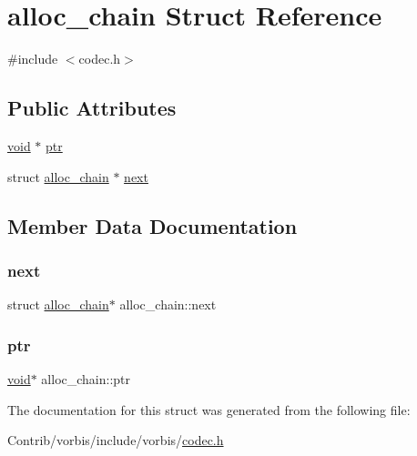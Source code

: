 \hypertarget{structalloc__chain}{}\section{alloc\+\_\+chain Struct Reference}
\label{structalloc__chain}


{\ttfamily \#include $<$codec.\+h$>$}

\subsection*{Public Attributes}
\begin{DoxyCompactItemize}
\item 
\mbox{\hyperlink{_s_d_l__opengles2__gl2ext_8h_ae5d8fa23ad07c48bb609509eae494c95}{void}} $\ast$ \mbox{\hyperlink{structalloc__chain_a564538413768f266bd5bda09d892e99d}{ptr}}
\item 
struct \mbox{\hyperlink{structalloc__chain}{alloc\+\_\+chain}} $\ast$ \mbox{\hyperlink{structalloc__chain_a596f6605e59080015c3c6dfd07326c83}{next}}
\end{DoxyCompactItemize}


\subsection{Member Data Documentation}
\mbox{\label{structalloc__chain_a596f6605e59080015c3c6dfd07326c83}} 
\subsubsection{\texorpdfstring{next}{next}}
{\footnotesize\ttfamily struct \mbox{\hyperlink{structalloc__chain}{alloc\+\_\+chain}}$\ast$ alloc\+\_\+chain\+::next}

\mbox{\label{structalloc__chain_a564538413768f266bd5bda09d892e99d}} 
\subsubsection{\texorpdfstring{ptr}{ptr}}
{\footnotesize\ttfamily \mbox{\hyperlink{_s_d_l__opengles2__gl2ext_8h_ae5d8fa23ad07c48bb609509eae494c95}{void}}$\ast$ alloc\+\_\+chain\+::ptr}



The documentation for this struct was generated from the following file\+:\begin{DoxyCompactItemize}
\item 
Contrib/vorbis/include/vorbis/\mbox{\hyperlink{codec_8h}{codec.\+h}}\end{DoxyCompactItemize}
